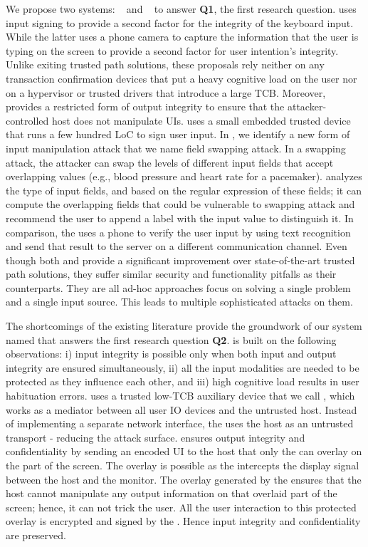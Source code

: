  We propose two systems: \integrikey~\cite{integrikey} and \integriscreen~\cite{integriscreen} to answer \textbf{Q1}, the first research question. \integrikey uses input signing to provide a second factor for the integrity of the keyboard input. While the latter uses a phone camera to capture the information that the user is typing on the screen to provide a second factor for user intention's integrity. Unlike exiting trusted path solutions, these proposals rely neither on any transaction confirmation devices that put a heavy cognitive load on the user nor on a hypervisor or trusted drivers that introduce a large TCB. Moreover, \integriscreen provides a restricted form of output integrity to ensure that the attacker-controlled host does not manipulate UIs. \integrikey uses a small embedded trusted device that runs a few hundred LoC to sign user input. In \integrikey, we identify a new form of input manipulation attack that we name field swapping attack. In a swapping attack, the attacker can swap the levels of different input fields that accept overlapping values (e.g., blood pressure and heart rate for a pacemaker). \integrikey analyzes the type of input fields, and based on the regular expression of these fields; it can compute the overlapping fields that could be vulnerable to swapping attack and recommend the user to append a label with the input value to distinguish it. 
In comparison, the \integriscreen uses a phone to verify the user input by using text recognition and send that result to the server on a different communication channel. Even though both \integrikey and \integriscreen provide a significant improvement over state-of-the-art trusted path solutions, they suffer similar security and functionality pitfalls as their counterparts. They are all ad-hoc approaches focus on solving a single problem and a single input source. This leads to multiple sophisticated attacks on them.

The shortcomings of the existing literature provide the groundwork of our system named \protection that answers the first research question \textbf{Q2}.
\protection is built on the following observations: i) input integrity is possible only when both input and output integrity are ensured simultaneously, ii) all the input modalities are needed to be protected as they influence each other, and iii) high cognitive load results in user habituation errors. \protection uses a trusted low-TCB auxiliary device that we call \deviceprotection, which works as a mediator between all user IO devices and the untrusted host. Instead of implementing a separate network interface, the \deviceprotection uses the host as an untrusted transport - reducing the attack surface. \protection ensures output integrity and confidentiality by sending an encoded UI to the host that only the \deviceprotection can overlay on the part of the screen. The overlay is possible as the \deviceprotection intercepts the display signal between the host and the monitor. The overlay generated by the \deviceprotection ensures that the host cannot manipulate any output information on that overlaid part of the screen; hence, it can not trick the user. All the user interaction to this protected overlay is encrypted and signed by the \deviceprotection. Hence input integrity and confidentiality are preserved.

